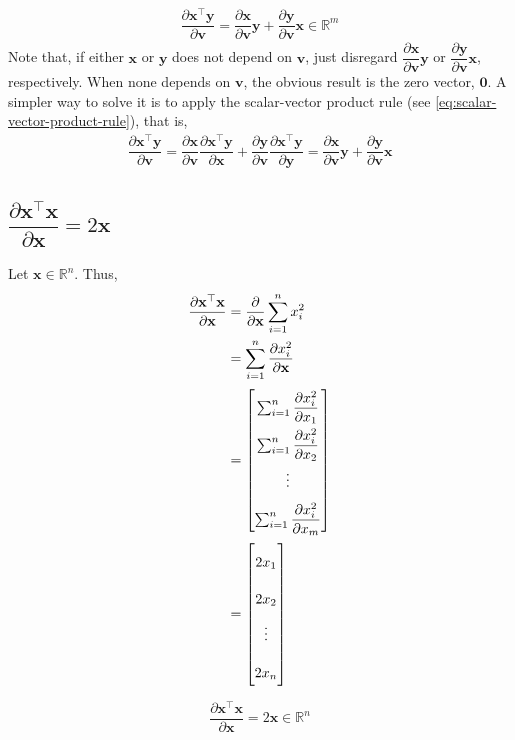 \documentclass{article}
\newcommand{\trans}{\top}
\begin{document}
\begin{align}
    \boxed{\dfrac{\partial \mathbf{x}^\trans \mathbf{y}}{\partial \mathbf{v}} = \dfrac{\partial \mathbf{x}}{\partial \mathbf{v}}\mathbf{y} + \dfrac{\partial \mathbf{y}}{\partial \mathbf{v}}\mathbf{x} \in \mathbb{R}^{m}}
\end{align}
Note that, if either \(\mathbf{x}\) or \(\mathbf{y}\) does not depend on \(\mathbf{v}\), just disregard \(\dfrac{\partial \mathbf{x}}{\partial \mathbf{v}}\mathbf{y}\) or \(\dfrac{\partial \mathbf{y}}{\partial \mathbf{v}}\mathbf{x}\), respectively. When none depends on \(\mathbf{v}\), the obvious result is the zero vector, \(\mathbf{0}\). A simpler way to solve it is to apply the scalar-vector product rule (see \eqref{eq:scalar-vector-product-rule}), that is,
\begin{align}
    \dfrac{\partial \mathbf{x}^\trans \mathbf{y}}{\partial \mathbf{v}} = \dfrac{\partial \mathbf{x}}{\partial \mathbf{v}} \dfrac{\partial \mathbf{x}^\trans \mathbf{y}}{\partial \mathbf{x}} + \dfrac{\partial \mathbf{y}}{\partial \mathbf{v}} \dfrac{\partial \mathbf{x}^\trans \mathbf{y}}{\partial \mathbf{y}} = \dfrac{\partial \mathbf{x}}{\partial \mathbf{v}}\mathbf{y} + \dfrac{\partial \mathbf{y}}{\partial \mathbf{v}}\mathbf{x}
\end{align}

\subsection{\(\dfrac{\partial \mathbf{x}^\trans \mathbf{x}}{\partial \mathbf{x}} = 2\mathbf{x}\)}
Let \(\mathbf{x} \in \mathbb{R}^{n}\). Thus,
\begin{align}
    \dfrac{\partial \mathbf{x}^\trans \mathbf{x}}{\partial \mathbf{x}} & = \dfrac{\partial}{\partial \mathbf{x}}\sum_{i=1}^{n} x_i^2 \\
    & = \sum_{i=1}^{n} \dfrac{\partial x_i^2}{\partial \mathbf{x}} \\
    & = \renewcommand{\arraystretch}{2.2}\begin{bmatrix}
        \sum_{i=1}^{n} \dfrac{\partial x_i^2}{\partial x_1} \\
        \sum_{i=1}^{n} \dfrac{\partial x_i^2}{\partial x_2} \\
        \vdots \\
        \sum_{i=1}^{n} \dfrac{\partial x_i^2}{\partial x_m} \\
    \end{bmatrix} \\
    & = \renewcommand{\arraystretch}{2.2}\begin{bmatrix}
        2x_1 \\
        2x_2 \\
        \vdots \\
        2x_n \\
    \end{bmatrix}
\end{align}
\begin{align}
    \boxed{\dfrac{\partial \mathbf{x}^\trans \mathbf{x}}{\partial \mathbf{x}} = 2\mathbf{x} \in \mathbb{R}^n}
\end{align}
\end{document}
